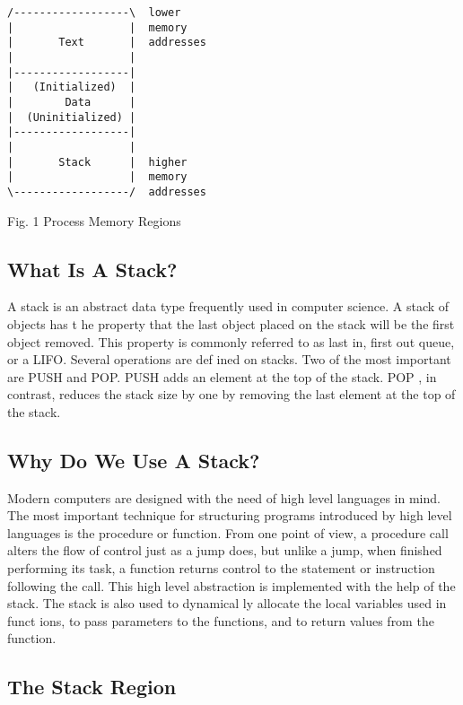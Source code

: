 \documentclass[10pt]{article}
\begin{document}
\begin{CJK}{UTF8}{bsmi}
\begin{lstlisting}[caption=Process Memory Regions]
/------------------\  lower
|                  |  memory
|       Text       |  addresses
|                  |
|------------------|
|   (Initialized)  |
|        Data      |
|  (Uninitialized) |
|------------------|
|                  |
|       Stack      |  higher
|                  |  memory
\------------------/  addresses
\end{lstlisting}

Fig. 1 Process Memory Regions

\subsection{What Is A Stack?}

A stack is an abstract data type frequently used in computer science.  A stack of objects has t he property that the 
last object placed on the stack will be the first object removed. This property is commonly referred to as last in, 
first out queue, or a LIFO. Several operations are def ined on stacks. Two of the most important are PUSH and 
POP. PUSH adds an element at the top of the stack. POP , in contrast, reduces the stack size by one by removing 
the last element at the top of the stack.

\subsection{Why Do We Use A Stack?}

Modern computers are designed with the need of high level languages in mind. The most important technique 
for structuring programs introduced by high level languages is the procedure or function. From one point of 
view, a procedure call alters the flow of control just as a jump does, but unlike a jump, when finished 
performing its task, a function returns control to the statement or instruction following the call. This high level 
abstraction is implemented with the help of the stack. The stack is also used to dynamical ly allocate the local 
variables used in funct ions, to pass parameters to the functions, and to return values from the function.

\subsection{The Stack Region}



\end{CJK}
\end{document}
